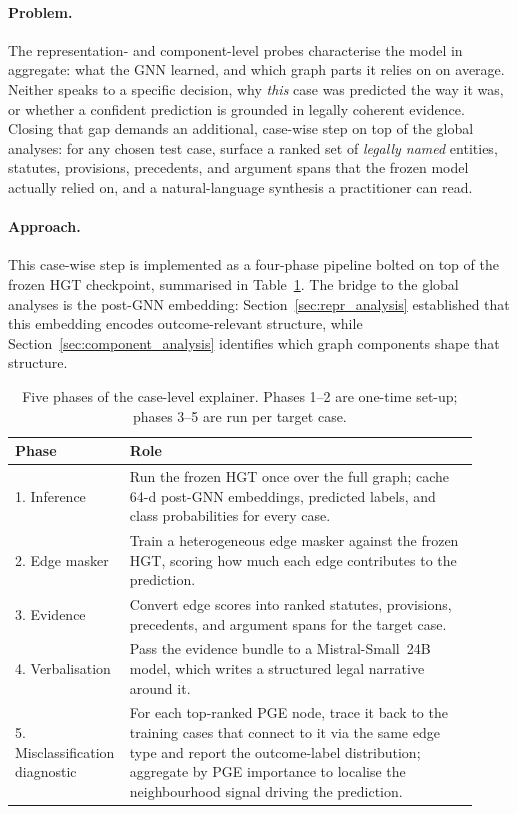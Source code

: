 \paragraph{Problem.}
The representation- and component-level probes characterise the
model in aggregate: what the GNN learned, and which graph parts it
relies on on average. Neither speaks to a specific decision, why
\emph{this} case was predicted the way it was, or whether a confident
prediction is grounded in legally coherent evidence. Closing that gap
demands an additional, case-wise step on top of the global analyses:
for any chosen test case, surface a ranked set of \emph{legally
named} entities, statutes, provisions, precedents, and argument spans
that the frozen model actually relied on, and a natural-language
synthesis a practitioner can read.

\paragraph{Approach.}
This case-wise step is implemented as a four-phase pipeline bolted
on top of the frozen HGT checkpoint, summarised in
Table~\ref{tab:case_phases}. The bridge to the global analyses is
the post-GNN embedding: Section~\ref{sec:repr_analysis} established
that this embedding encodes outcome-relevant structure, while
Section~\ref{sec:component_analysis} identifies which graph components
shape that structure.

\begin{table}[H]
  \centering
  \footnotesize
  \begin{tabular}{@{}p{0.18\linewidth}p{0.74\linewidth}@{}}
    \toprule
    \textbf{Phase} & \textbf{Role} \\
    \midrule
    1. Inference & Run the frozen HGT once over the full graph; cache 64-d post-GNN embeddings, predicted labels, and class probabilities for every case. \\
    2. Edge masker & Train a heterogeneous edge masker against the frozen HGT, scoring how much each edge contributes to the prediction. \\
    3. Evidence & Convert edge scores into ranked statutes, provisions, precedents, and argument spans for the target case. \\
    4. Verbalisation & Pass the evidence bundle to a Mistral-Small~24B model, which writes a structured legal narrative around it. \\
    5. Misclassification diagnostic & For each top-ranked PGE node, trace it back to the training cases that connect to it via the same edge type and report the outcome-label distribution; aggregate by PGE importance to localise the neighbourhood signal driving the prediction. \\
    \bottomrule
  \end{tabular}
  \caption{Five phases of the case-level explainer. Phases 1--2 are
  one-time set-up; phases 3--5 are run per target case.}
  \label{tab:case_phases}
\end{table}

